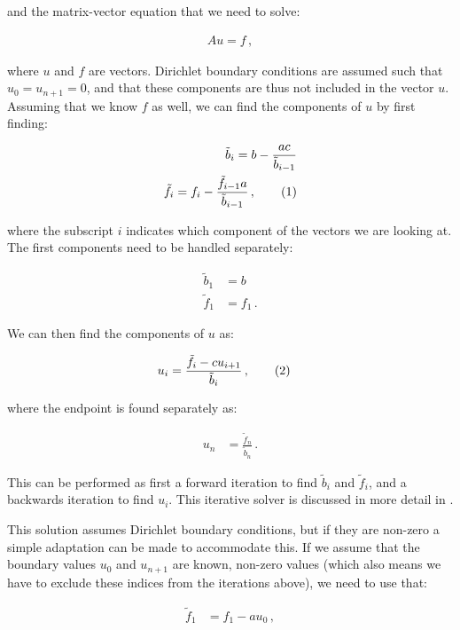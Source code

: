 \documentclass[reprint,english,notitlepage]{revtex4-1}  %
\newcommand\numberthis{\addtocounter{equation}{1}\tag{\theequation}}
\begin{document}
and the matrix-vector equation that we need to solve:

\begin{align*}
Au = f \, ,
\end{align*}

where $u$ and $f$ are vectors. Dirichlet boundary conditions are assumed such that $u_0 = u_{n+1} = 0$, and that these components are thus not included in the vector $u$. Assuming that we know $f$ as well, we can find the components of $u$ by first finding:

\begin{align*}
\tilde{b}_i = b - \frac{ac}{\tilde{b}_{i-1}} \\
\tilde{f}_i = f_i - \frac{\tilde{f}_{i-1} a}{\tilde{b}_{i-1}} \, , \numberthis \label{eq:tridiag_forward}
\end{align*}

where the subscript $i$ indicates which component of the vectors we are looking at. The first components need to be handled separately:

\begin{align*}
\tilde{b}_1 &= b \\
\tilde{f}_1 &= f_1 \, .
\end{align*}

We can then find the components of $u$ as:

\begin{align*}
u_i &= \frac{\tilde{f}_i - c u_{i+1}}{\tilde{b}_{i}} \, , \numberthis \label{eq:tridiag_backward}
\end{align*}

where the endpoint is found separately as:

\begin{align*}
u_n &= \frac{\tilde{f}_n}{\tilde{b}_n} \, .
\end{align*}

This can be performed as first a forward iteration to find $\tilde{b}_i$ and $\tilde{f}_i$, and a backwards iteration to find $u_i$. This iterative solver is discussed in more detail in \citep{Project1}.

This solution assumes Dirichlet boundary conditions, but if they are non-zero a simple adaptation can be made to accommodate this. If we assume that the boundary values $u_0$ and $u_{n+1}$ are known, non-zero values (which also means we have to exclude these indices from the iterations above), we need to use that:

\begin{align*}
\tilde{f}_1 &= f_1 - au_0 \, ,
\end{align*} 
\end{document}
